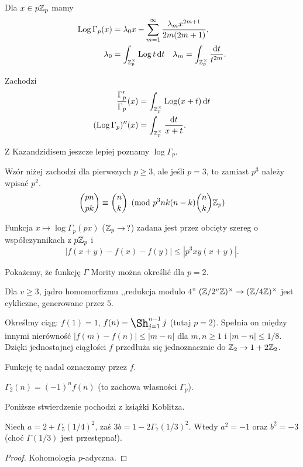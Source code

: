 \begin{fakt}
	Dla $x \in p \mathbb Z_p$ mamy
	\begin{align*}
	\operatorname{Log} \Gamma_p (x) & = \lambda_0 x - \sum_{m =1}^\infty \frac{\lambda_m x^{2m+1}}{2m(2m+1)}, \\
	\lambda_0 & = \int_{\mathbb Z_p^\times} \operatorname{Log} t \,\textrm{d}t \quad \lambda_m = \int_{\mathbb Z_p^\times} \frac{\textrm{d}t}{t^{2m}}.
	\end{align*}
\end{fakt}

\begin{wniosek}
	Zachodzi
	\begin{align*}
	\frac{\Gamma_p'}{\Gamma_p}(x) & = \int_{\mathbb Z_p^\times} \operatorname{Log} (x+t) \,\textrm{d}t \\
	(\operatorname{Log} \Gamma_p)'' (x) & = \int_{\mathbb Z_p^\times} \frac{\textrm{d}t}{x+t}.
	\end{align*}
\end{wniosek}

Z Kazandzidisem jeszcze lepiej poznamy $\log \Gamma_p$.

\begin{twierdzenie}[Kazandzidis]
	Wzór niżej zachodzi dla pierwszych $p \ge 3$, ale jeśli $p = 3$, to zamiast $p^3$ należy wpisać $p^2$.
	\[
		{pn \choose pk} \equiv {n \choose k} \pmod {p^3nk(n-k) {n \choose k}\mathbb Z_p}
	\]
\end{twierdzenie}

\begin{fakt}
	Funkcja $x \mapsto \log \Gamma_p (px)$ ($\mathbb Z_p \to \, ?$) zadana jest przez obcięty szereg o współczynnikach z $p \mathbb Z_p$ i
	\[
		|f(x + y) - f(x) - f(y)| \le |p^3xy(x+y)|.
	\]
\end{fakt}

Pokażemy, że funkcję $\Gamma$ Mority można określić dla $p = 2$.

\begin{fakt}
	Dla $v \ge 3$, jądro homomorfizmu ,,redukcja modulo $4$'' $(\mathbb Z/2^v \mathbb Z)^\times \to (\mathbb Z / 4 \mathbb Z)^\times$ jest cykliczne, generowane przez $5$.
\end{fakt}

Określmy ciąg: $f(1) = 1$, $f(n) = \shaprod_{j=1}^{n-1} j$ (tutaj $p = 2$).
Spełnia on między innymi nierówność $|f(m) - f(n)| \le |m-n|$ dla $m,n \ge 1$ i $|m-n| \le 1/8$.
Dzięki jednostajnej ciągłości $f$ przedłuża się jednoznacznie do $\mathbb Z_2 \to 1+2\mathbb Z_2$.

Funkcję tę nadal oznaczamy przez $f$.

\begin{definicja}
	$\Gamma_2 (n) = (-1)^n f(n)$ (to zachowa własności $\Gamma_p$).
\end{definicja}

Poniższe stwierdzenie pochodzi z książki Koblitza.

\begin{fakt}
	Niech $a = 2 + \Gamma_5(1/4)^2$, zaś $3b = 1 - 2 \Gamma_7(1/3)^2$.
	Wtedy $a^2 = -1$ oraz $b^2 = -3$ (choć $\Gamma(1/3)$ jest przestępna!).
\end{fakt}

\begin{proof}
	Kohomologia $p$-adyczna.
\end{proof}